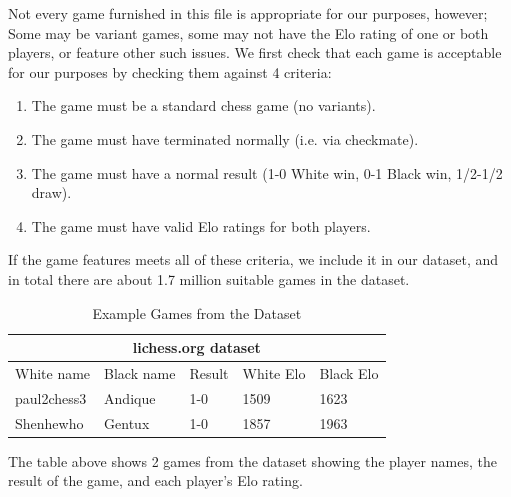 \documentclass[conference]{IEEEtran}
\begin{document}
Not every game furnished in this file is appropriate for our purposes, however; Some may be variant games, some may not have the Elo rating of one or both players, or feature other such issues. We first check that each game is acceptable for our purposes by checking them against 4 criteria:
\begin{enumerate}
    \item The game must be a standard chess game (no variants).
    \item The game must have terminated normally (i.e. via checkmate).
    \item The game must have a normal result (1-0 White win, 0-1 Black win, 1/2-1/2 draw).
    \item The game must have valid Elo ratings for both players.
\end{enumerate}
If the game features meets all of these criteria, we include it in our dataset, and in total there are about 1.7 million suitable games in the dataset.

\begin{table}[htbp]
\vspace{.01cm}
\caption{Example Games from the Dataset}
\begin{center}
\begin{tabular}{|lllll|}
\hline
\multicolumn{5}{|c|}{lichess.org dataset}                                                                                                      \\ \hline
\multicolumn{1}{|l|}{White name}  & \multicolumn{1}{l|}{Black name} & \multicolumn{1}{l|}{Result} & \multicolumn{1}{l|}{White Elo} & Black Elo \\ \hline
\multicolumn{1}{|l|}{paul2chess3} & \multicolumn{1}{l|}{Andique}    & \multicolumn{1}{l|}{1-0}    & \multicolumn{1}{l|}{1509}      & 1623      \\ \hline
\multicolumn{1}{|l|}{Shenhewho}   & \multicolumn{1}{l|}{Gentux}     & \multicolumn{1}{l|}{1-0}    & \multicolumn{1}{l|}{1857}      & 1963      \\ \hline
\end{tabular}
\begin{minipage}{8cm}
    \vspace{0.1cm}
    \small The table above shows 2 games from the dataset showing the player names, the result of the game, and each player's Elo rating.
\end{minipage}
\end{center}
\label{table:example-games}
\end{table}
\end{document}
